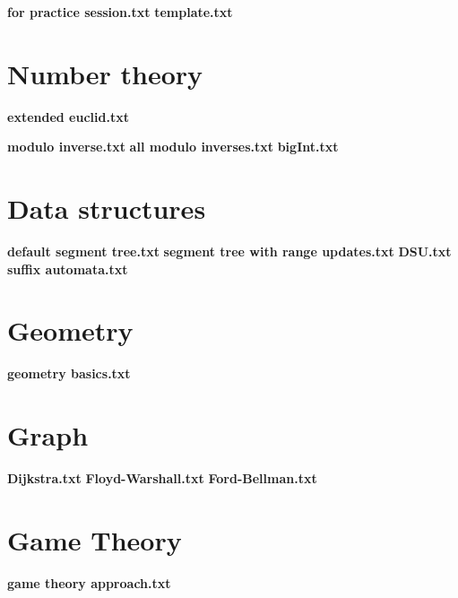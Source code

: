 \documentclass[a4paper]{article}
\newcommand{\AddSection}[1]{\textbf{#1} }
\begin{document}
\AddSection{for practice session.txt}
\AddSection{template.txt}

\section{Number theory} 

\AddSection{extended euclid.txt}

\AddSection{modulo inverse.txt}
\AddSection{all modulo inverses.txt}
\AddSection{bigInt.txt}

\section{Data structures}

\AddSection{default segment tree.txt}
\AddSection{segment tree with range updates.txt}
\AddSection{DSU.txt}
\AddSection{suffix automata.txt}

\section{Geometry}
\AddSection{geometry basics.txt}

\section{Graph}
\AddSection{Dijkstra.txt}
\AddSection{Floyd-Warshall.txt}
\AddSection{Ford-Bellman.txt}
\section{Game Theory}
\AddSection{game theory approach.txt}
\end{document}
